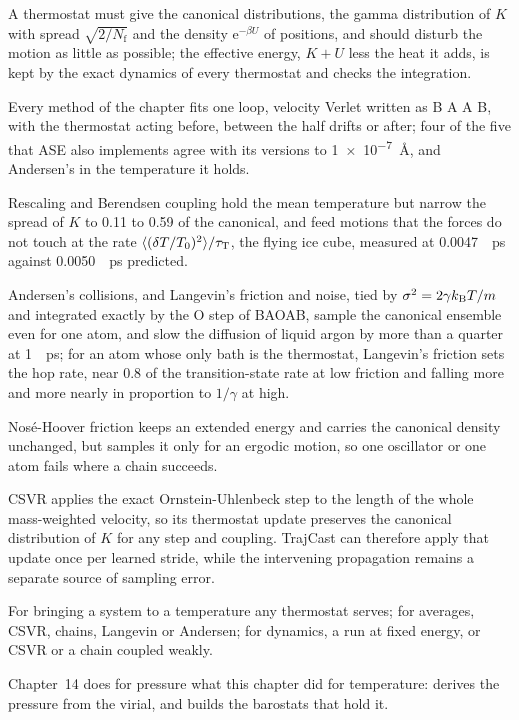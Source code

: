 
A thermostat must give the canonical distributions, the gamma
distribution of $K$ with spread $\sqrt{2/N_{\mathrm f}}$ and the density
$\mathrm{e}^{-\beta U}$ of positions, and should disturb the motion as
little as possible; the effective energy, $K + U$ less the heat it adds,
is kept by the exact dynamics of every thermostat and checks the
integration.

Every method of the chapter fits one loop, velocity Verlet
written as B A A B, with the thermostat acting before, between the half
drifts or after; four of the five that ASE also implements agree with its
versions to \SI{1e-7}{\angstrom}, and Andersen's in the temperature it
holds.

Rescaling and Berendsen coupling hold the mean temperature but narrow the
spread of $K$ to 0.11 to 0.59 of the canonical, and feed motions that the
forces do not touch at the rate $\langle (\delta T/T_0)^2 \rangle/\tau_{\mathrm T}$,
the flying
ice cube, measured at \SI{0.0047}{\per\pico\second} against
\SI{0.0050}{\per\pico\second} predicted.

Andersen's collisions, and
Langevin's friction and noise, tied by $\sigma^2 = 2\gamma k_{\mathrm{B}} T/m$ and
integrated exactly by the O step of BAOAB, sample the canonical ensemble
even for one atom, and slow the diffusion of liquid argon by more than a
quarter at \SI{1}{\per\pico\second}; for an atom whose only bath is the
thermostat, Langevin's friction sets the hop rate, near 0.8 of the
transition-state rate at low friction and falling more and more nearly
in proportion to $1/\gamma$ at high.

Nosé-Hoover friction keeps an extended energy and carries the
canonical density unchanged, but samples it only for an ergodic motion,
so one oscillator or one atom fails where a chain succeeds.

CSVR applies
the exact Ornstein-Uhlenbeck step to the length of the whole
mass-weighted velocity, so its thermostat update preserves the canonical distribution of $K$
for any step and coupling. TrajCast can therefore apply that update once
per learned stride, while the intervening propagation remains a separate
source of sampling error.

For bringing
a system to a temperature any thermostat serves; for averages, CSVR,
chains, Langevin or Andersen; for dynamics, a run at fixed energy, or CSVR or a
chain coupled weakly.

Chapter~14 does for pressure what this chapter did for temperature:
derives the pressure from the virial, and builds the barostats that hold
it.
